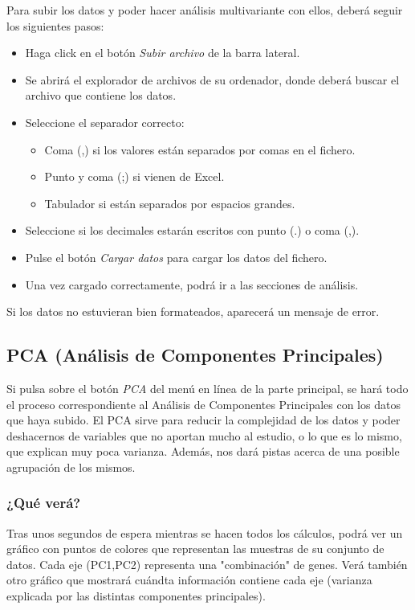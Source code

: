 Para subir los datos y poder hacer análisis multivariante con ellos, deberá seguir los siguientes pasos:

\begin{itemize}
    \item Haga click en el botón \textit{Subir archivo} de la barra lateral.
    \item Se abrirá el explorador de archivos de su ordenador, donde deberá buscar el archivo que
    contiene los datos.
    \item Seleccione el separador correcto:
    \begin{itemize}
        \item Coma (,) si los valores están separados por comas en el fichero.
        \item Punto y coma (;) si vienen de Excel.
        \item Tabulador si están separados por espacios grandes.
    \end{itemize}
    \item Seleccione si los decimales estarán escritos con punto (.) o coma (,).
    \item Pulse el botón \textit{Cargar datos} para cargar los datos del fichero.
    \item Una vez cargado correctamente, podrá ir a las secciones de análisis.
\end{itemize}

Si los datos no estuvieran bien formateados, aparecerá un mensaje de error.

\subsection{PCA (Análisis de Componentes Principales)}

Si pulsa sobre el botón \textit{PCA} del menú en línea de la parte principal, se hará todo el proceso correspondiente
al Análisis de Componentes Principales con los datos que haya subido. El PCA sirve para reducir la complejidad de los datos
y poder deshacernos de variables que no aportan mucho al estudio, o lo que es lo mismo, que explican muy poca varianza. Además, 
nos dará pistas acerca de una posible agrupación de los mismos.

\subsubsection{¿Qué verá?}

Tras unos segundos de espera mientras se hacen todos los cálculos, podrá ver un gráfico con puntos de colores que representan las muestras
de su conjunto de datos. Cada eje (PC1,PC2) representa una "combinación" de genes. Verá también otro gráfico que mostrará cuándta información
contiene cada eje (varianza explicada por las distintas componentes principales).

